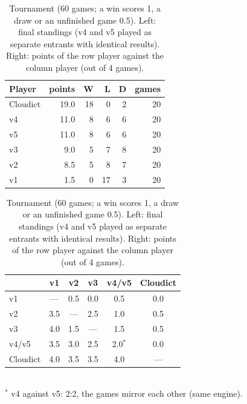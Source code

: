 \documentclass[a4paper,10pt,twocolumn]{article}
\begin{document}
\begin{table}[t]
\centering
\caption{Tournament (60 games; a win scores 1, a draw or an unfinished game 0.5). Left: final standings (v4 and v5 played as separate entrants with identical results). Right: points of the row player against the column player (out of 4 games).}
\label{tab:tournament}
\begin{minipage}[t]{0.42\textwidth}\centering
\begin{tabular}{@{}lrrrrr@{}}
\toprule
Player & points & W & L & D & games \\
\midrule
Cloudict & 19.0 & 18 & 0 & 2 & 20 \\
v4 & 11.0 & 8 & 6 & 6 & 20 \\
v5 & 11.0 & 8 & 6 & 6 & 20 \\
v3 & 9.0 & 5 & 7 & 8 & 20 \\
v2 & 8.5 & 5 & 8 & 7 & 20 \\
v1 & 1.5 & 0 & 17 & 3 & 20 \\
\bottomrule
\end{tabular}
\end{minipage}\hfill
\begin{minipage}[t]{0.54\textwidth}\centering
\begin{tabular}{@{}lccccc@{}}
\toprule
& v1 & v2 & v3 & v4/v5 & Cloudict \\
\midrule
v1 & --- & 0.5 & 0.0 & 0.5 & 0.0 \\
v2 & 3.5 & --- & 2.5 & 1.0 & 0.5 \\
v3 & 4.0 & 1.5 & --- & 1.5 & 0.5 \\
v4/v5 & 3.5 & 3.0 & 2.5 & 2.0$^{*}$ & 0.0 \\
Cloudict & 4.0 & 3.5 & 3.5 & 4.0 & --- \\
\bottomrule
\end{tabular}\\[2pt]
{\footnotesize $^{*}$ v4 against v5: 2:2, the games mirror each other (same engine).}
\end{minipage}
\end{table}
\end{document}
